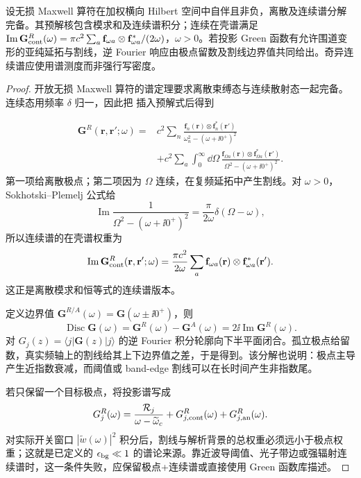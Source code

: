 \begin{proposition}
设无损 Maxwell 算符在加权横向 Hilbert 空间中自伴且非负，离散及连续谱分解完备。其预解核包含模求和及连续谱积分；连续在壳谱满足 $\operatorname{Im}\mathbf G_{\rm cont}^R(\omega)=\pi c^2\sum_a\mathbf f_{\omega a}\otimes\mathbf f_{\omega a}^*/(2\omega)$，$\omega>0$。若投影 Green 函数有允许围道变形的亚纯延拓与割线，逆 Fourier 响应由极点留数及割线边界值共同给出。奇异连续谱应使用谱测度而非强行写密度。
\end{proposition}
\begin{proof}
开放无损 Maxwell 算符的谱定理要求离散束缚态与连续散射态一起完备。连续态用频率 $\delta$ 归一，因此把 插入预解式后得到

\[
\begin{aligned}
\mathbf G^R(\mathbf r,\mathbf r';\omega)
={}&c^2\sum_n
\frac{\mathbf f_n(\mathbf r)\otimes\mathbf f_n^*(\mathbf r')}
{\omega_n^2-(\omega+\ii0^+)^2}\\
&+c^2\sum_a\int_0^\infty\dd\Omega\,
\frac{\mathbf f_{\Omega a}(\mathbf r)\otimes\mathbf f_{\Omega a}^*(\mathbf r')}
{\Omega^2-(\omega+\ii0^+)^2}.
\end{aligned}
\]
第一项给离散极点；第二项因为 $\Omega$ 连续，在复频延拓中产生割线。对 $\omega>0$，Sokhotski--Plemelj 公式给
\[
\operatorname{Im}\frac1{\Omega^2-(\omega+\ii0^+)^2}
=\frac{\pi}{2\omega}\delta(\Omega-\omega),
\]
所以连续谱的在壳谱权重为
\[
\operatorname{Im}\mathbf G_{\rm cont}^R(\mathbf r,\mathbf r';\omega)
=\frac{\pi c^2}{2\omega}
\sum_a\mathbf f_{\omega a}(\mathbf r)
\otimes\mathbf f_{\omega a}^*(\mathbf r').
\]
这正是离散模求和恒等式的连续谱版本。

定义边界值
$\mathbf G^{R/A}(\omega)=\mathbf G(\omega\pm\ii0^+)$，则
\[
\operatorname{Disc}\mathbf G(\omega)
=\mathbf G^R(\omega)-\mathbf G^A(\omega)
=2\ii\operatorname{Im}\mathbf G^R(\omega).
\]
对 $G_j(z)=\langle j|\mathbf G(z)|j\rangle$ 的逆 Fourier 积分轮廓向下半平面闭合。孤立极点给留数，真实频轴上的割线给其上下边界值之差，于是得到。该分解也说明：极点主导产生近指数衰减，而阈值或 band-edge 割线可以在长时间产生非指数尾。

若只保留一个目标极点，将投影谱写成
\[
G_j^R(\omega)
=\frac{\mathcal R_j}{\omega-\widetilde\omega_c}
+G_{j,\mathrm{cont}}^R(\omega)+G_{j,\rm an}^R(\omega).
\]
对实际开关窗口 $|\widetilde w(\omega)|^2$ 积分后，割线与解析背景的总权重必须远小于极点权重；这就是已定义的 $\epsilon_{\rm bg}\ll1$ 的谱论来源。靠近波导阈值、光子带边或强辐射连续谱时，这一条件失败，应保留极点+连续谱或直接使用 Green 函数库描述。
\end{proof}


